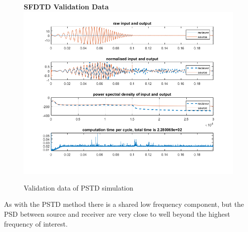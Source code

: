 \begin{figure}[H]
\centering
\textbf{SFDTD Validation Data}
  \includegraphics[width=\textwidth]{./graphics/SFDTDvalidationFinal.png}
  \caption{Validation data of PSTD simulation}
\end{figure}
As with the PSTD method there is a shared low frequency component, but the PSD between source and receiver are very close to well beyond the highest frequency of interest.